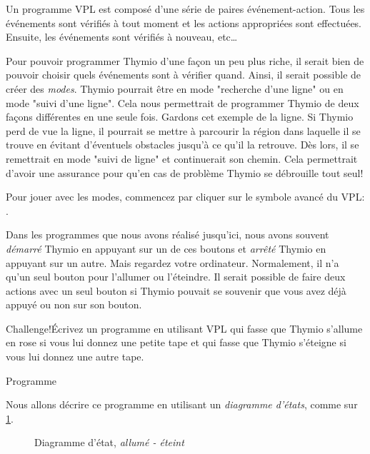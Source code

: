 \label{ch.states}

Un programme VPL est composé d'une série de paires événement-action. Tous les événements sont vérifiés à tout moment et les actions appropriées sont effectuées. Ensuite, les événements sont vérifiés à nouveau, etc\ldots

Pour pouvoir programmer Thymio d'une façon un peu plus riche, il serait bien de pouvoir choisir quels événements sont à vérifier quand. Ainsi, il serait possible de créer des \textit{modes}. Thymio pourrait être en mode "recherche d'une ligne" ou en mode "suivi d'une ligne". Cela nous permettrait de programmer Thymio de deux façons différentes en une seule fois. Gardons cet exemple de la ligne. Si Thymio perd de vue la ligne, il pourrait se mettre à parcourir la région dans laquelle il se trouve en évitant d'éventuels obstacles jusqu'à ce qu'il la retrouve. Dès lors, il se remettrait en mode "suivi de ligne" et continuerait son chemin. Cela permettrait d'avoir une assurance pour qu'en cas de problème Thymio se débrouille tout seul!

Pour jouer avec les modes, commencez par cliquer sur le symbole avancé du VPL:   .



Dans les programmes que nous avons réalisé jusqu'ici, nous avons souvent \emph{démarré} Thymio en appuyant sur un de ces boutons et \emph{arrêté} Thymio en appuyant sur un autre. Mais regardez votre ordinateur. Normalement, il n'a qu'un seul bouton pour l'allumer ou l'éteindre. Il serait possible de faire deux actions avec un seul bouton si Thymio pouvait se souvenir que vous avez déjà appuyé ou non sur son bouton.

\begin{bclogo}[couleur = pink!30, arrondi = 0.1, logo = \bccrayon, ombre = true]{Challenge!}Écrivez un programme en utilisant VPL qui fasse que Thymio s'allume en rose si vous lui donnez une petite tape et qui fasse que Thymio s'éteigne si vous lui donnez une autre tape.
\end{bclogo}

{\raggedleft \hfill Programme }

Nous allons décrire ce programme en utilisant un \textit{diagramme d'états}, comme sur \cref{fig.turn-on-off}.

\begin{figure}
\begin{center}
\caption{Diagramme d'état, \textit{allumé - éteint}}\label{fig.turn-on-off}
\end{center}
\end{figure}


